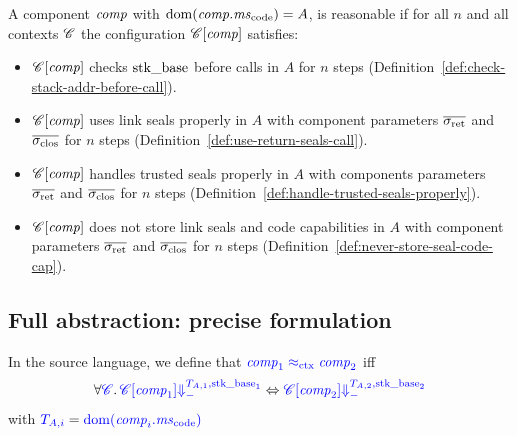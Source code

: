 \documentclass[a4paper]{article}
\begin{document}

\begin{definition}
  A component $\var{comp}$ with $\dom(\var{comp}.\mscode) = A$, is reasonable if for all $n$ and all contexts $\context$ the configuration $\plug{\context}{\var{comp}}$ satisfies:
  \begin{itemize}
  \item $\plug{\context}{\var{comp}}$ checks $\stkb$ before calls in $A$ for $n$ steps (Definition~\ref{def:check-stack-addr-before-call}).
  \item $\plug{\context}{\var{comp}}$ uses link seals properly in $A$ with component parameters $\sigrets$ and $\sigcloss$ for $n$ steps (Definition~\ref{def:use-return-seals-call}).
  \item $\plug{\context}{\var{comp}}$ handles trusted seals properly in $A$ with components parameters $\sigrets$ and $\sigcloss$ for $n$ steps (Definition~\ref{def:handle-trusted-seals-properly}).
  \item $\plug{\context}{\var{comp}}$ does not store link seals and code capabilities in $A$ with component parameters $\sigrets$ and $\sigcloss$ for $n$ steps (Definition~\ref{def:never-store-seal-code-cap}).
  \end{itemize}
\end{definition}

\subsection{Full abstraction: precise formulation}
\label{sec:full-abstr-prec}

\begin{definition}
  In the source language, we define that $\src{\var{comp}_1 \sconeq \var{comp}_2}$ iff
  \begin{equation*}
    \forall \src{\context} \ldotp \src{\plug{\context}{\var{comp}_1} \sterm{\ta[,1],\stkb_1}} \Leftrightarrow \src{\plug{\context}{\var{comp}_2} \sterm{\ta[,2],\stkb_2}}
  \end{equation*}
  with $\src{\ta[,i]} = \src{\dom(\var{comp}_i.\mscode)}$
\end{definition}
\end{document}
